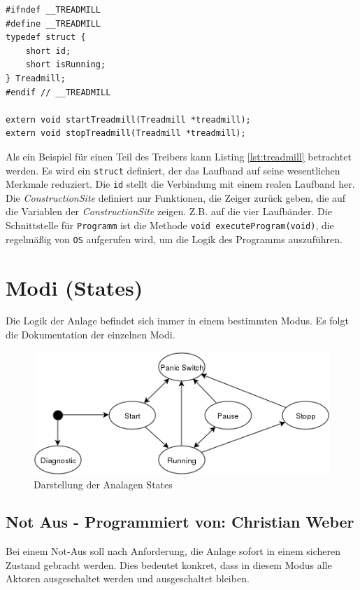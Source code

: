 \documentclass[fontsize=11pt,a4paper,final]{scrartcl}[2003/01/01]
\makeatletter
\def\ScaleIfNeeded{%
	\ifdim\Gin@nat@width>\linewidth
		\linewidth
	\else
		\Gin@nat@width
	\fi
}
\newcommand*{\chris}{%
	Programmiert von: Christian Weber
}
\makeatother
\begin{document}
\begin{lstlisting}[caption={Beispiel: Treiber für Laufband},label={lst:treadmill}]
#ifndef __TREADMILL
#define __TREADMILL
typedef struct {
    short id;
    short isRunning;
} Treadmill;
#endif // __TREADMILL

extern void startTreadmill(Treadmill *treadmill);
extern void stopTreadmill(Treadmill *treadmill);
\end{lstlisting}
Als ein Beispiel für einen Teil des Treibers kann Listing \ref{lst:treadmill} betrachtet werden. Es wird ein \lstinline|struct| definiert, der das Laufband auf seine wesentlichen Merkmale reduziert. Die \lstinline|id| stellt die Verbindung mit einem realen Laufband her. Die \textit{ConstructionSite} definiert nur Funktionen, die Zeiger zurück geben, die auf die Variablen der \textit{ConstructionSite} zeigen. Z.B. auf die vier Laufbänder. Die Schnittstelle für \lstinline|Programm| ist die Methode \lstinline|void executeProgram(void)|, die regelmäßig von \lstinline|OS| aufgerufen wird, um die Logik des Programms auszuführen.

\section{Modi (States)}
Die Logik der Anlage befindet sich immer in einem bestimmten Modus. Es folgt die Dokumentation der einzelnen Modi.
\begin{figure}[H]
	\centering
	\includegraphics[width=0.7\ScaleIfNeeded]{Bilder/StateAutomat.png}
	\caption{Darstellung der Analagen States}
	\label{fig:Automat}
\end{figure}

\subsection{Not Aus - \chris}
Bei einem Not-Aus soll nach Anforderung, die Anlage sofort in einem sicheren Zustand gebracht werden. Dies bedeutet konkret, dass in diesem Modus alle Aktoren ausgeschaltet werden und ausgeschaltet bleiben.
\end{document}
